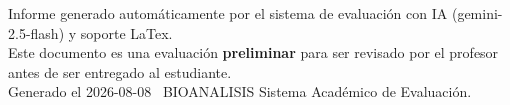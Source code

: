 \documentclass[11pt,a4paper]{article}
\begin{document}
\vspace{12pt}
\begin{center}
  \footnotesize\color{gray}
  Informe generado automáticamente por el sistema de evaluación con IA (gemini-2.5-flash) y soporte LaTex. \\
  Este documento es una evaluación \textbf{preliminar} para ser revisado por el profesor antes de ser entregado al 
  estudiante. \\
  Generado el 2026-08-08 \textbullet\ BIOANALISIS Sistema Académico de Evaluación.
  \end{center}
\end{document}

